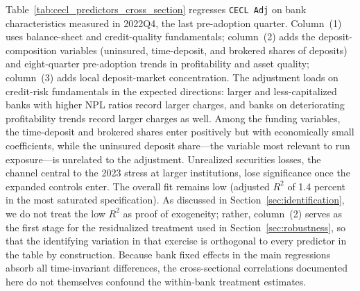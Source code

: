 Table~\ref{tab:cecl_predictors_cross_section} regresses \texttt{CECL Adj} on
bank characteristics measured in 2022Q4, the last pre-adoption quarter.
Column~(1) uses balance-sheet and credit-quality fundamentals; column~(2)
adds the deposit-composition variables (uninsured, time-deposit, and brokered
shares of deposits) and eight-quarter pre-adoption trends in profitability
and asset quality; column~(3) adds local deposit-market concentration.  The
adjustment loads on credit-risk fundamentals in the expected directions:
larger and less-capitalized banks with higher NPL ratios record larger
charges, and banks on deteriorating profitability trends record larger
charges as well.  Among the funding variables, the time-deposit and brokered
shares enter positively but with economically small coefficients, while the
uninsured deposit share---the variable most relevant to run exposure---is
unrelated to the adjustment.  Unrealized securities losses, the channel
central to the 2023 stress at larger institutions, lose significance once the
expanded controls enter.  The overall fit remains low (adjusted $R^2$ of 1.4
percent in the most saturated specification).  As discussed in
Section~\ref{sec:identification}, we do not treat the low $R^2$ as proof of
exogeneity; rather, column~(2) serves as the first stage for the residualized
treatment used in Section~\ref{sec:robustness}, so that the identifying
variation in that exercise is orthogonal to every predictor in the table by
construction.  Because bank fixed effects in the main regressions absorb all
time-invariant differences, the cross-sectional correlations documented here
do not themselves confound the within-bank treatment estimates.
